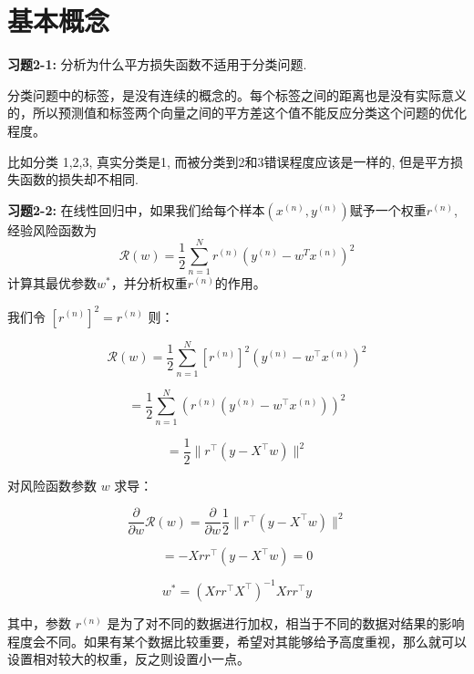 \section{基本概念}

\noindent\textbf{习题2-1:} 分析为什么平方损失函数不适用于分类问题.

分类问题中的标签，是没有连续的概念的。每个标签之间的距离也是没有实际意义的，所以预测值和标签两个向量之间的平方差这个值不能反应分类这个问题的优化程度。

比如分类 1,2,3, 真实分类是1, 而被分类到2和3错误程度应该是一样的, 但是平方损失函数的损失却不相同.

\noindent\textbf{习题2-2:} 在线性回归中，如果我们给每个样本$(x^{(n)},y^{(n)})$赋予一个权重$r^{(n)}$,
经验风险函数为
\begin{equation}
\mathcal{R}(w) = \frac{1}{2}\sum_{n=1}^N r^{(n)}(y^{(n)} - w^T x^{(n)})^2
\end{equation}
计算其最优参数$w^{*}$，并分析权重$r^{(n)}$的作用。

我们令 $[r^{(n)}]^2 = r^{(n)}$ 则：

\[\mathcal{R}(w) = \frac{1}{2}\sum_{n=1}^N [r^{(n)}]^2(y^{(n)} - w^\top x^{(n)})^2\]

\[= \frac{1}{2}\sum_{n=1}^N \left(r^{(n)}(y^{(n)} - w^\top x^{(n)})\right)^2\]

\[= \frac{1}{2}\|r^\top(y - X^\top w)\|^2\]

对风险函数参数 $w$ 求导：

\[\frac{\partial}{\partial w}\mathcal{R}(w) = \frac{\partial}{\partial w}\frac{1}{2}\|r^\top(y - X^\top w)\|^2\]

\[= -Xrr^\top(y - X^\top w) = 0\]

\[w^* = (Xrr^\top X^\top)^{-1}Xrr^\top y\]

其中，参数 $r^{(n)}$ 是为了对不同的数据进行加权，相当于不同的数据对结果的影响程度会不同。如果有某个数据比较重要，希望对其能够给予高度重视，那么就可以设置相对较大的权重，反之则设置小一点。

